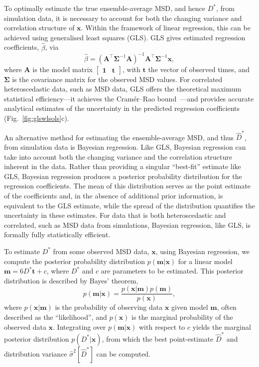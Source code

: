 \documentclass[reprint,superscriptaddress,nobibnotes,amsmath,amssymb,aps,prx,hidelinks,linenumbers]{revtex4-2}
\newcommand{\oMSD}{\ensuremath{\bm{x}}}
\newcommand{\modelmatrix}{\mathbf{A}}
\newcommand{\model}{\bm{m}}
\newcommand{\prob}[1]{\ensuremath{p(#1)}}
\newcommand{\Dest}{\ensuremath{\widehat{D}^*}}
\newcommand{\D}{\ensuremath{D^*}}
\newcommand{\varest}[1]{\ensuremath{\widehat{\sigma}^2[#1]}}
\begin{document}
To optimally estimate the true ensemble-average MSD, and hence $\D$, from simulation data, it is necessary to account for both the changing variance and correlation structure of $\oMSD$.
Within the framework of linear regression, this can be achieved using generalised least squares (GLS).
GLS gives estimated regression coefficients, $\widehat{\beta}$, via
%
\begin{equation}
    \widehat{\beta} = \left(\modelmatrix^{\top}\mathbf{\Sigma}^{-1}\modelmatrix\right)^{-1}\modelmatrix^{\top}\mathbf{\Sigma}^{-1}\oMSD,
    \label{equ:gls}
\end{equation} 
%
where $\modelmatrix$ is the model matrix $\begin{bmatrix}\mathbf{1} & \bm{t}\end{bmatrix}$, with $\bm{t}$ the vector of observed times, and $\mathbf{\Sigma}$ is the covariance matrix for the observed MSD values.
For correlated heteroscedastic data, such as MSD data, GLS offers the theoretical maximum statistical efficiency---it achieves the Cram\'er--Rao bound~\cite{cramer_mathematical_1946,rao_information_1945,rao_selected_1994,darmois_sur_1945,aitken_on_1942}---and provides accurate analytical estimates of the uncertainty in the predicted regression coefficients (Fig.~\ref{fig:glswlsols}c).

An alternative method for estimating the ensemble-average MSD, and thus $\Dest$, from simulation data is Bayesian regression.
Like GLS, Bayesian regression can take into account both the changing variance and the correlation structure inherent in the data.
Rather than providing a singular ``best-fit'' estimate like GLS, Bayesian regression produces a posterior probability distribution for the regression coefficients.
The mean of this distribution serves as the point estimate of the coefficients and, in the absence of additional prior information, is equivalent to the GLS estimate, while the spread of the distribution quantifies the uncertainty in these estimates.
For data that is both heteroscedastic and correlated, such as MSD data from simulations, Bayesian regression, like GLS, is formally fully statistically efficient.

To estimate $\D$ from some observed MSD data, $\oMSD$, using Bayesian regression, we compute the posterior probability distribution $\prob{\model|\oMSD}$ for a linear model $\model = 6\D \bm{t} + c$, where $\D$ and $c$ are parameters to be estimated.
This posterior distribution is described by Bayes' theorem,
%
\begin{equation}
    \prob{\model|\oMSD} = \frac{\prob{{\oMSD|\model}}\prob{\model}}{\prob{\oMSD}},
    \label{equ:bayes}
\end{equation}
%
where $\prob{\oMSD|\model}$ is the probability of observing data $\oMSD$ given model $\model$, often described as the ``likelihood'', and $\prob{\oMSD}$ is the marginal probability of the observed data $\oMSD$.
Integrating over $\prob{\model|\oMSD}$ with respect to $c$ yields the marginal posterior distribution $\prob{\D|\oMSD}$, from which the best point-estimate $\Dest$ and distribution variance $\varest{\Dest}$ can be computed.
\end{document}
